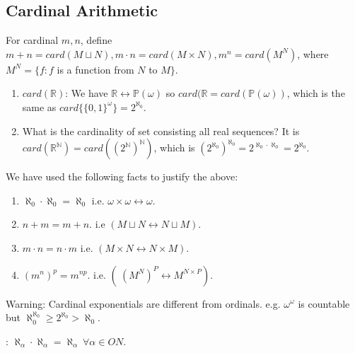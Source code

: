 \subsection{Cardinal Arithmetic}
\begin{definition} For cardinal $m,n$, define $m+n=card(M \sqcup N), m \cdot n=card(M \times N), m^n=card(M^N)$, where $M^N=\{f: f$ is a function from $N$ to $M\}$.
\end{definition}
\begin{example}
\begin{enumerate}
\item $card(\mathbb{R})$: We have $\mathbb{R} \leftrightarrow \mathbb{P}(\omega)$ so $card(\mathbb{R}=card(\mathbb{P}(\omega))$, which is the same as $card\{\{0,1\}^\omega\}=2^{\aleph_0}$.
\item What is the cardinality of set consisting all real sequences?
It is $card(\mathbb{R}^\mathbb{N}) =card((2^\mathbb{N})^\mathbb{N})$, which is $(2^{\aleph_0})^{\aleph_0}=2^{\aleph_0 \cdot \aleph_0} = 2^{\aleph_0}$.
\end{enumerate}
\end{example}
\begin{remark} We have used the following facts to justify the above:
\begin{enumerate}
\item $\aleph_0 \cdot \aleph_0 = \aleph_0$ i.e. $\omega \times \omega \leftrightarrow \omega$.\\
\item $n+m=m+n$. i.e $(M \sqcup N \leftrightarrow N \sqcup M)$.\\
\item $m \cdot n= n \cdot m$ i.e. $(M \times N \leftrightarrow N \times M)$.\\
\item $(m^n)^p=m^{np}$. i.e. $(~(M^N)^P \leftrightarrow M^{N \times P})$.
\end{enumerate}
\end{remark}
Warning: Cardinal exponentials are different from ordinals. e.g. $\omega ^ \omega$ is countable but $\aleph_0 ^{\aleph_0} \ge 2^{\aleph_0} > \aleph_0$.
\begin{theorem}: $\aleph_\alpha \cdot \aleph_\alpha = \aleph_\alpha ~ \forall \alpha \in ON$.
\end{theorem}
